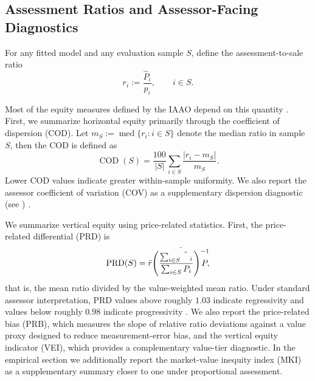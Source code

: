 \documentclass[12pt]{article}
\theoremstyle{plain}
\theoremstyle{definition}
\begin{document}
\subsection{Assessment Ratios and Assessor-Facing Diagnostics}

For any fitted model and any evaluation sample \(S\), define the assessment-to-sale ratio
\begin{equation}
\label{eq:ratio_def}
r_i:=\frac{\hat P_i}{p_i},
\qquad i\in S.
\end{equation}

Most of the equity measures defined by the IAAO depend on this quantity \cite{IAAO2013Ratio}. First, we summarize horizontal equity primarily through the coefficient of dispersion (COD). Let
$
m_S:=\operatorname{med}\{r_i:i\in S\}
$
denote the median ratio in sample \(S\), then the COD is defined as
\begin{equation}
\label{eq:cod}
\operatorname{COD}(S)
=
\frac{100}{|S|}\sum_{i\in S}\frac{|r_i-m_S|}{m_S}.
\end{equation}
Lower COD values indicate greater within-sample uniformity. We also report the assessor coefficient of variation (COV) as a supplementary dispersion diagnostic (see \cite{IAAO2013Ratio}) .

We summarize vertical equity using price-related statistics. First, the price-related differential (PRD) is
\begin{equation}
\label{eq:prd}
\operatorname{PRD}(S)
=
\Bar r \dot
{\left(\frac{\sum_{i\in S}\hat P_i}{\sum_{i\in S}P_i}\right)^{-1}},
\end{equation}
that is, the mean ratio divided by the value-weighted mean ratio. Under standard assessor interpretation, PRD values above roughly \(1.03\) indicate regressivity and values below roughly \(0.98\) indicate progressivity \cite{IAAO2013Ratio,IAAO2025ExposureRatio}. We also report the price-related bias (PRB), which measures the slope of relative ratio deviations against a value proxy designed to reduce measurement-error bias, and the vertical equity indicator (VEI), which provides a complementary value-tier diagnostic. In the empirical section we additionally report the market-value inequity index (MKI) as a supplementary summary closer to one under proportional assessment. 
\end{document}
